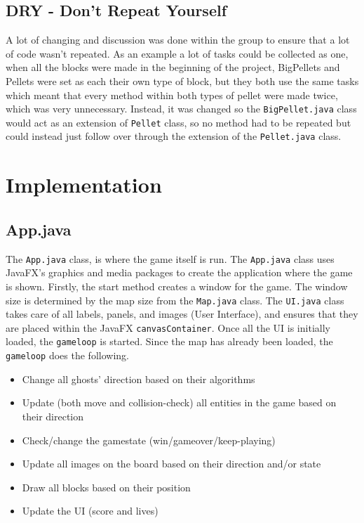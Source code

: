 \documentclass[a4paper,5pt]{article}
\begin{document}
\subsection{DRY - Don't Repeat Yourself}
A lot of changing and discussion was done within the group to ensure that a lot of code wasn't repeated. As an example a lot of tasks could be collected as one, when all the blocks were made in the beginning of the project, BigPellets and Pellets were set as each their own type of block, but they both use the same tasks which meant that every method within both types of pellet were made twice, which was very unnecessary. Instead, it was changed so the \texttt{BigPellet.java} class would act as an extension of \texttt{Pellet} class, so no method had to be repeated but could instead just follow over through the extension of the \texttt{Pellet.java} class.


\newpage
\section{Implementation}
\subsection{App.java}
The \texttt{App.java} class, is where the game itself is run. The \texttt{App.java} class uses JavaFX's graphics and media packages to create the application where the game is shown. Firstly, the start method creates a window for the game. The window size is determined by the map size from the \texttt{Map.java} class. The \texttt{UI.java} class takes care of all labels, panels, and images (User Interface), and ensures that they are placed within the JavaFX \texttt{canvasContainer}. Once all the UI is initially loaded, the \texttt{gameloop} is started. Since the map has already been loaded, the \texttt{gameloop} does the following.
\begin{itemize}
    \item[1. ] Change all ghosts' direction based on their algorithms 
    \item[2. ] Update (both move and collision-check) all entities in the game based on their direction
    \item[3. ] Check/change the gamestate (win/gameover/keep-playing)
    \item[4. ] Update all images on the board based on their direction and/or state
    \item[5. ] Draw all blocks based on their position
    \item[6. ] Update the UI (score and lives)
\end{itemize}
\end{document}
